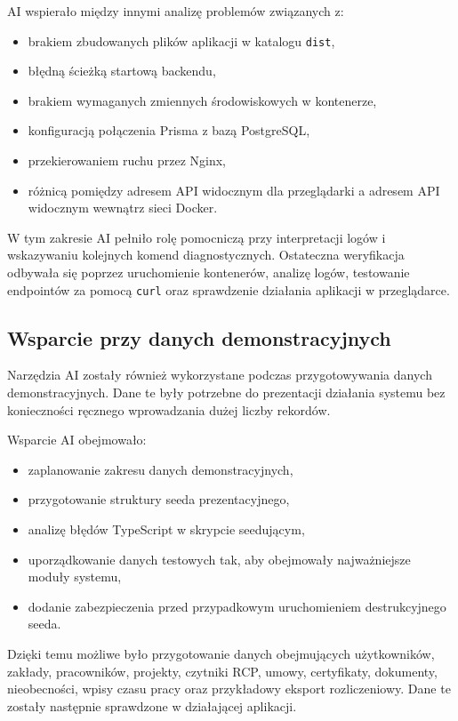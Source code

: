 AI wspierało między innymi analizę problemów związanych z:
\begin{itemize}
    \item brakiem zbudowanych plików aplikacji w katalogu \texttt{dist},
    \item błędną ścieżką startową backendu,
    \item brakiem wymaganych zmiennych środowiskowych w kontenerze,
    \item konfiguracją połączenia Prisma z bazą PostgreSQL,
    \item przekierowaniem ruchu przez Nginx,
    \item różnicą pomiędzy adresem API widocznym dla przeglądarki a adresem API widocznym wewnątrz sieci Docker.
\end{itemize}

W tym zakresie AI pełniło rolę pomocniczą przy interpretacji logów i wskazywaniu kolejnych komend diagnostycznych. Ostateczna weryfikacja odbywała się poprzez uruchomienie kontenerów, analizę logów, testowanie endpointów za pomocą \texttt{curl} oraz sprawdzenie działania aplikacji w przeglądarce.

\subsection{Wsparcie przy danych demonstracyjnych}

Narzędzia AI zostały również wykorzystane podczas przygotowywania danych demonstracyjnych. Dane te były potrzebne do prezentacji działania systemu bez konieczności ręcznego wprowadzania dużej liczby rekordów.

Wsparcie AI obejmowało:
\begin{itemize}
    \item zaplanowanie zakresu danych demonstracyjnych,
    \item przygotowanie struktury seeda prezentacyjnego,
    \item analizę błędów TypeScript w skrypcie seedującym,
    \item uporządkowanie danych testowych tak, aby obejmowały najważniejsze moduły systemu,
    \item dodanie zabezpieczenia przed przypadkowym uruchomieniem destrukcyjnego seeda.
\end{itemize}

Dzięki temu możliwe było przygotowanie danych obejmujących użytkowników, zakłady, pracowników, projekty, czytniki RCP, umowy, certyfikaty, dokumenty, nieobecności, wpisy czasu pracy oraz przykładowy eksport rozliczeniowy. Dane te zostały następnie sprawdzone w działającej aplikacji.

